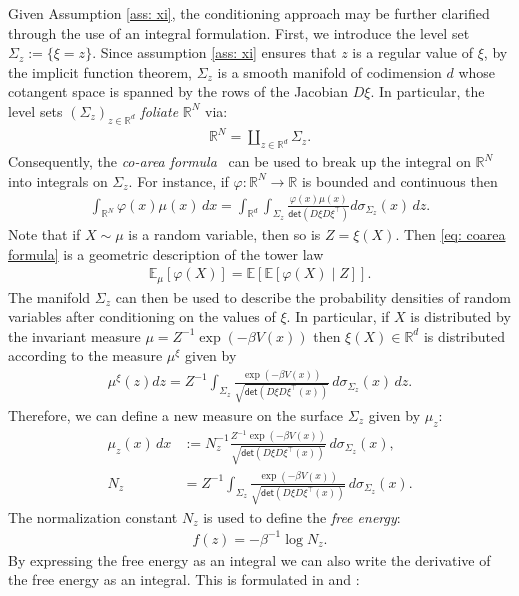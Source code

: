 \documentclass[reqno, 12pt]{article}
\begin{document}
Given Assumption \ref{ass: xi}, the conditioning approach may be further clarified through the use of an integral formulation. First, we introduce the level set $\Sigma_{z} := \{\xi = z\}$. Since assumption \eqref{ass: xi} ensures that $z$ is a regular value of $\xi$, by the implicit function theorem, $\Sigma_z$ is a smooth manifold of codimension $d$ whose cotangent space is spanned by the rows of the Jacobian $D\xi$. In particular, the level sets $\left(\Sigma_z\right)_{z \in \mathbb{R}^{d}}$ \emph{foliate} $\mathbb{R}^{N}$ via:
\begin{align}
    \mathbb{R}^{N} = \coprod_{z \in \mathbb{R}^d} \Sigma_{z}. 
\end{align}
Consequently, the \emph{co-area formula}~\cite{Evans1992} can be used to break up the integral on $\mathbb{R}^{N}$ into integrals on $\Sigma_z$. For instance, if $\varphi: \mathbb{R}^{N} \to \mathbb{R}$ is bounded and continuous then 
\begin{align}
    \int_{\mathbb{R}^{N}}\varphi(x)\mu(x)\,dx = \int_{\mathbb{R}^{d}}\int_{\Sigma_{z}}\frac{\varphi(x)\mu(x)}{\textsf{det}(D\xi D\xi^{\top})}d\sigma_{\Sigma_z}(x)\,dz. \label{eq: coarea formula}
\end{align}
Note that if $X \sim \mu$ is a random variable, then so is $Z = \xi(X)$. Then \eqref{eq: coarea formula} is a geometric description of the tower law
\begin{align}
    \mathbb{E}_{\mu}[\varphi(X)] = \mathbb{E}\left[\mathbb{E}\left[\varphi(X) \mid Z\right]\right]. \label{eq: tower law}
\end{align}
The manifold $\Sigma_z$ can then be used to describe the probability densities of random variables after conditioning on the values of $\xi$. In particular, if $X$ is distributed by the invariant measure $\mu=Z^{-1}\exp(-\beta V(x))$ then $\xi(X) \in \mathbb{R}^d$ is distributed according to the measure $\mu^{\xi}$ given by
\begin{align}
    \mu^{\xi}(z) dz = Z^{-1}\int_{\Sigma_{z}}\frac{\exp \left(-\beta V(x)\right)}{\sqrt{\textsf{det}(D\xi D\xi^{\top}(x))}}\,d\sigma_{\Sigma_z}(x)\,dz.
    \label{eq: conditional measure}
\end{align}
Therefore, we can define a new measure on the surface $\Sigma_z$ given by $\mu_z$: 
\begin{align}
    \mu_z(x)\,dx &:= N_{z}^{-1}\frac{Z^{-1}\exp \left(-\beta V(x)\right)}{\sqrt{\textsf{det}(D\xi D\xi^{\top}(x))}}\,d\sigma_{\Sigma_z}(x),\\ 
    N_z &= Z^{-1}\int_{\Sigma_{z}}\frac{\exp \left(-\beta V(x)\right)}{\sqrt{\textsf{det}(D\xi D\xi^{\top}(x))}}\,d\sigma_{\Sigma_z}(x). 
\end{align}
The normalization constant $N_z$ is used to define the \emph{free energy}: 
\begin{align}
    f(z) = -\beta^{-1}\log N_z.  \label{eq: free energy}
\end{align}
By expressing the free energy as an integral we can also write the derivative of the free energy as an integral. This is formulated in \parencite[Lemma 2.2]{legoll2010effective} and \parencite[Lemma 2.4]{duong2018quantification}: 
\end{document}
